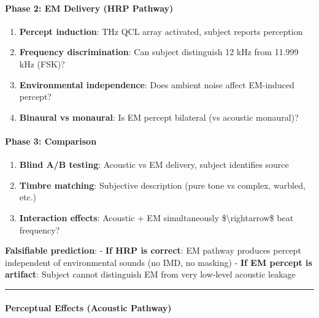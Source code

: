 \paragraph{Phase 2: EM Delivery (HRP
Pathway)}\label{phase-2-em-delivery-hrp-pathway}

\begin{enumerate}
\def\labelenumi{\arabic{enumi}.}
\tightlist
\item
  \textbf{Percept induction}: THz QCL array activated, subject reports
  perception
\item
  \textbf{Frequency discrimination}: Can subject distinguish 12 kHz from
  11.999 kHz (FSK)?
\item
  \textbf{Environmental independence}: Does ambient noise affect
  EM-induced percept?
\item
  \textbf{Binaural vs monaural}: Is EM percept bilateral (vs acoustic
  monaural)?
\end{enumerate}

\paragraph{Phase 3: Comparison}\label{phase-3-comparison}

\begin{enumerate}
\def\labelenumi{\arabic{enumi}.}
\tightlist
\item
  \textbf{Blind A/B testing}: Acoustic vs EM delivery, subject
  identifies source
\item
  \textbf{Timbre matching}: Subjective description (pure tone vs
  complex, warbled, etc.)
\item
  \textbf{Interaction effects}: Acoustic + EM simultaneously
  \$\textbackslash rightarrow\$ beat frequency?
\end{enumerate}

\textbf{Falsifiable prediction}: - \textbf{If HRP is correct}: EM
pathway produces percept independent of environmental sounds (no IMD, no
masking) - \textbf{If EM percept is artifact}: Subject cannot
distinguish EM from very low-level acoustic leakage

\begin{center}\rule{0.5\linewidth}{0.5pt}\end{center}

\paragraph{Perceptual Effects (Acoustic
Pathway)}\label{perceptual-effects-acoustic-pathway}

